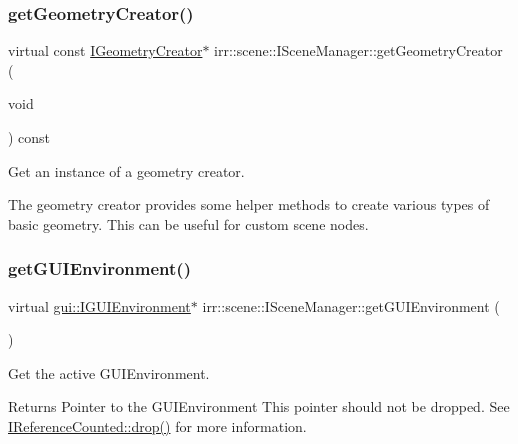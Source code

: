 \subsubsection{\texorpdfstring{get\+Geometry\+Creator()}{getGeometryCreator()}\hspace{0.1cm}{\footnotesize\ttfamily [2/2]}}
{\footnotesize\ttfamily virtual const \hyperlink{classirr_1_1scene_1_1IGeometryCreator}{I\+Geometry\+Creator}$\ast$ irr\+::scene\+::\+I\+Scene\+Manager\+::get\+Geometry\+Creator (\begin{DoxyParamCaption}\item[{void}]{ }\end{DoxyParamCaption}) const\hspace{0.3cm}{\ttfamily [pure virtual]}}



Get an instance of a geometry creator. 

The geometry creator provides some helper methods to create various types of basic geometry. This can be useful for custom scene nodes. \mbox{\label{classirr_1_1scene_1_1ISceneManager_ad887536e9cc41d0670364f9f0a0f4510}} 
\subsubsection{\texorpdfstring{get\+G\+U\+I\+Environment()}{getGUIEnvironment()}\hspace{0.1cm}{\footnotesize\ttfamily [1/2]}}
{\footnotesize\ttfamily virtual \hyperlink{classirr_1_1gui_1_1IGUIEnvironment}{gui\+::\+I\+G\+U\+I\+Environment}$\ast$ irr\+::scene\+::\+I\+Scene\+Manager\+::get\+G\+U\+I\+Environment (\begin{DoxyParamCaption}{ }\end{DoxyParamCaption})\hspace{0.3cm}{\ttfamily [pure virtual]}}



Get the active G\+U\+I\+Environment. 

\begin{DoxyReturn}{Returns}
Pointer to the G\+U\+I\+Environment This pointer should not be dropped. See \hyperlink{classirr_1_1IReferenceCounted_a03856a09355b89d178090c4a5f738543}{I\+Reference\+Counted\+::drop()} for more information. 
\end{DoxyReturn}
\mbox{\label{classirr_1_1scene_1_1ISceneManager_ad887536e9cc41d0670364f9f0a0f4510}} 
